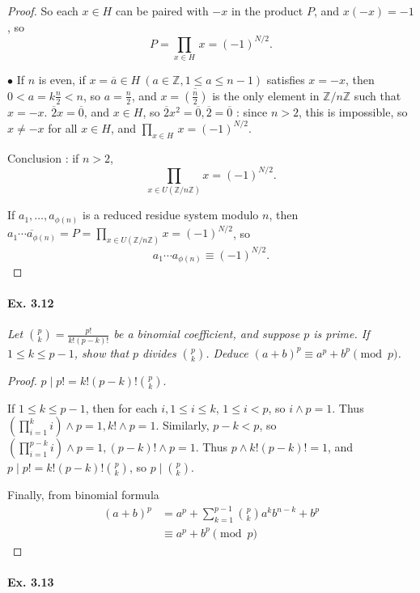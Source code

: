 \documentclass[11pt,a4paper]{article}
\newcommand{\Z}{\mathbb{Z}}
\begin{document}
{\begin{proof}
So each $x \in H$ can be paired with $-x$ in the product $P$, and $x(-x) = -1$, so
$$P = \prod_{x\in H} \, x = (-1)^{N/2}.$$

$\bullet$ If $n$ is even, if $x = \overline{a}\in H\ (a\in \Z, 1\leq a \leq n-1)$ satisfies $x = -x$, then $0 < a = k \frac{n}{2} < n$, so $a = \frac{n}{2}$, and $x = \overline{ \left(\frac{n}{2}\right)}$ is the only element in $\Z/n\Z$ such that $x = -x$. $\overline{2}x = \overline{0}$, and $x \in H$, so $\overline{2} x^2 = \overline{0}, \overline{2} = \overline{0}$ : since $n>2$, this is impossible, so $x \neq -x$ for all $x \in H$, and $\prod_{x\in H} \, x = (-1)^{N/2}$.

Conclusion : if $n>2$, $$\prod_{x \in U(\Z/n\Z)} x = (-1)^{N/2}.$$

If $a_1, \ldots, a_{\phi(n)}$ is a reduced residue system modulo $n$, then $\overline{ a_1 \cdots a_{\phi(n)}}  = P = \prod_{x \in U(\Z/n\Z)} x = (-1)^{N/2}$, so 
$$a_1 \cdots a_{\phi(n)} \equiv (-1)^{N/2}.$$
\end{proof}

\paragraph{Ex. 3.12}

{\it Let ${p \choose k} = \frac{p!}{k!(p-k)!}$ be a binomial coefficient, and suppose $p$ is prime. If $1 \leq k \leq p-1$, show that $p$ divides ${p \choose k}$. Deduce $(a+b)^p \equiv a^p + b^p \pmod p$.
}

\begin{proof}
$p \mid p! = k!(p-k)! {p \choose k}$.

If $1\leq k \leq p-1$, then for each $i, 1\leq i \leq k$, $1\leq i < p$, so $i\wedge p=1$. Thus $ \left(\prod_{i=1}^k i \right) \wedge p = 1, k!\wedge p = 1$. Similarly, $p-k<p$, so $\left( \prod_{i=1}^{p-k} i \right)\wedge p = 1, (p-k)!\wedge p = 1$. Thus $p \wedge k!(p-k)! = 1$, and $p \mid p! = k!(p-k)! {p \choose k}$, so $p \mid {p \choose k}$.

Finally, from binomial formula
\begin{align*}
(a+b)^p &= a^p + \sum_{k=1}^{p-1} {p \choose k} a^k b^{n-k} + b^p\\
&\equiv a^p + b^p \pmod p
\end{align*}
\end{proof}

\paragraph{Ex. 3.13}

}
\end{document}
